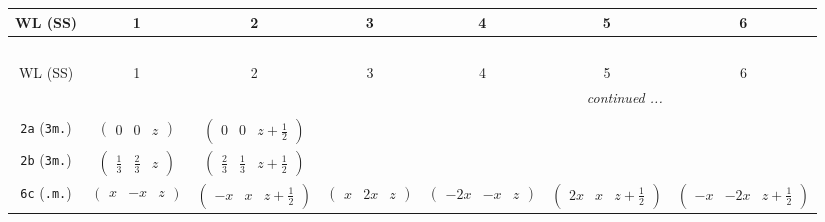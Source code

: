 \documentclass[fleqn,9pt,landscape]{jsarticle}
\begin{document}
\begin{center}
\renewcommand{\arraystretch}{1.2}
\begin{longtable}{ccccccc}
 \hline \hline
WL (SS) & 1 & 2 & 3 & 4 & 5 & 6 \\ \hline \endfirsthead

\multicolumn{6}{l}{\tablename\ \thetable{}} \\
 \hline \hline
WL (SS) & 1 & 2 & 3 & 4 & 5 & 6 \\ \hline \endhead

 \hline \hline
\multicolumn{6}{r}{\footnotesize\it continued ...} \\ \endfoot

 \hline \hline
\multicolumn{6}{r}{} \\ \endlastfoot

{\tt 2a} ({\tt 3m.}) & $ \begin{pmatrix} 0 & 0 & z \end{pmatrix} $ & $ \begin{pmatrix} 0 & 0 & z + \frac{1}{2} \end{pmatrix} $ & $  $ & $  $ & $  $ & $  $ \\ \hline
{\tt 2b} ({\tt 3m.}) & $ \begin{pmatrix} \frac{1}{3} & \frac{2}{3} & z \end{pmatrix} $ & $ \begin{pmatrix} \frac{2}{3} & \frac{1}{3} & z + \frac{1}{2} \end{pmatrix} $ & $  $ & $  $ & $  $ & $  $ \\ \hline
{\tt 6c} ({\tt .m.}) & $ \begin{pmatrix} x & - x & z \end{pmatrix} $ & $ \begin{pmatrix} - x & x & z + \frac{1}{2} \end{pmatrix} $ & $ \begin{pmatrix} x & 2 x & z \end{pmatrix} $ & $ \begin{pmatrix} - 2 x & - x & z \end{pmatrix} $ & $ \begin{pmatrix} 2 x & x & z + \frac{1}{2} \end{pmatrix} $ & $ \begin{pmatrix} - x & - 2 x & z + \frac{1}{2} \end{pmatrix} $ \\ \hline

\end{longtable}
\end{center}
\end{document}
